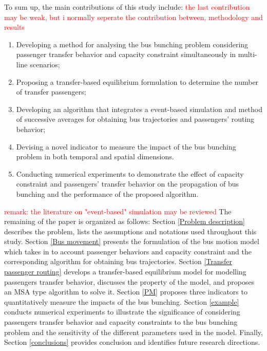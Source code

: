 \documentclass[smallextended]{svjour3}       %
\begin{document}
\begin{Abstract}
To sum up, the main contributions of this study include:
\textcolor{red}{the last contribution may be weak, but i normally seperate the contribution between, methodology and results}
\begin{enumerate}
    \item Developing a method for analysing the bus bunching problem considering passenger transfer behavior and capacity constraint simultaneously in multi-line scenarios;
    \item Proposing a transfer-based equilibrium formulation to determine the number of transfer passengers;
    \item Developing an algorithm that integrates a event-based simulation and method of successive averages 
     for obtaining bus trajectories and passengers' routing behavior;
    \item Devising a novel indicator to measure the impact of the bus bunching problem in both temporal and spatial dimensions.
    \item Conducting numerical experiments to demonstrate the effect of capacity constraint and passengers' transfer behavior on the propagation of bus bunching and the performance of the proposed algorithm.
\end{enumerate}

\textcolor{red}{remark: the literature on "event-based" simulation may be reviewed}
The remaining of the paper is organized as follows: 
Section \ref{Problem description} describes the problem, lists the assumptions and notations used throughout this study. 
Section \ref{Bus movement} presents the formulation of the bus motion model which takes in to account passenger behaviors and capacity constraint and the corresponding algorithm for obtaining bus trajectories. 
Section \ref{Transfer passenger routing} develops a transfer-based equilibrium model for modelling passengers transfer behavior, discusses the property of the model, and proposes an MSA type algorithm to solve it.
Section \ref{PM} proposes three indicators to quantitatively measure the impacts of the bus bunching.
Section \ref{example} conducts numerical experiments to illustrate the significance of considering passengers transfer behavior and capacity constraints to the bus bunching problem and the sensitivity of the different parameters used in the model.
Finally, Section \ref{conclusions} provides conclusion and identifies future research directions.


\end{Abstract}
\end{document}
